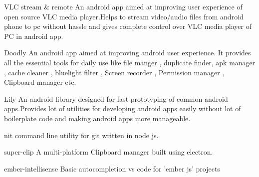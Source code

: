 
\begin{cventries}
  \cvproject
    {VLC stream \& remote} %
    {An android app aimed at improving user experience of open source VLC media player.Helps to stream video/audio files from android phone to pc without hassle and gives complete control over VLC media player of PC in android app.} %
  
  \cvproject
    {Doodly}
    {An android app aimed at improving android user experience. It provides all the essential tools for daily use like file manger , duplicate finder, apk manager , cache cleaner , bluelight filter , Screen recorder , Permission manager , Clipboard manager etc.}

  \cvproject
    {Lily}
    {An android library designed for fast prototyping of common android apps.Provides lot of utilities for developing android apps easily without lot of boilerplate code and making android apps more manageable.}

  \cvproject
    {nit}
    {command line utility for git written in node js.}

  \cvproject
    {super-clip}
    {A multi-platform Clipboard manager built using electron.}
  
  \cvproject
    {ember-intellisense}
    {Basic autocompletion vs code for 'ember js' projects}

\end{cventries}
